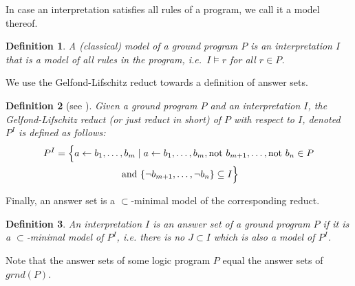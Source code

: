 \documentclass{vutinfth} %
\newtheorem{definition}{Definition}[section]
\newcommand{\fail}{\mathrm{not } \ \xspace}
\newcommand{\from}{\ensuremath{\leftarrow}}
\begin{document}
In case an interpretation satisfies all rules of a program, we call it a model thereof.

\begin{definition}
A \emph{(classical) model} of a ground program $P$ is an interpretation $I$ that is a model of all rules in the program, i.e.~$I \models r$ for all $r \in P$.
\end{definition}

We use the Gelfond-Lifschitz reduct towards a definition of answer sets.

\begin{definition}[see {\cite[Section 2]{stable}}]
	Given a ground program $P$ and an interpretation $I$, the \emph{Gelfond-Lifschitz reduct} (or just \emph{reduct} in short) of $P$ with respect to $I$, denoted $P^I$ is defined as follows:
\begin{multline*}
P^I = \Bigl\{ a \from b_1, \ldots , b_m \mid a \from b_1, \ldots, b_m, \fail b_{m+1}, \ldots, \fail b_n \in P\\ \text{ and } \{ \neg b_{m+1} , \ldots , \neg b_n \} \subseteq I \Bigr\}
\end{multline*}
\end{definition}

Finally, an answer set is a $\subset$-minimal model of the corresponding reduct.

\begin{definition}
An interpretation $I$ is an \emph{answer set} of a ground program $P$ if it is a $\subset$-minimal model of $P^I$, i.e. there is no $J \subset I$ which is also a model of $P^I$.
\end{definition}

Note that the answer sets of some logic program $P$ equal the answer sets of $grnd(P)$.
\end{document}
